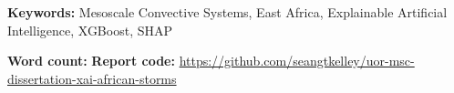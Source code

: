 \noindent
\textbf{Keywords:} Mesoscale Convective Systems, East Africa, Explainable Artificial Intelligence, XGBoost, SHAP

\vfill
\noindent
\textbf{Word count:}  \newline
\newline
\noindent
\textbf{Report code:} \href{https://github.com/seangtkelley/uor-msc-dissertation-xai-african-storms}{https://github.com/seangtkelley/uor-msc-dissertation-xai-african-storms}  \newline

